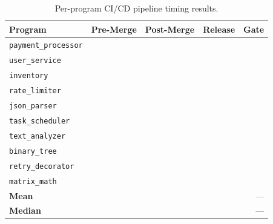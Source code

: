 \documentclass[11pt]{article}
\begin{document}
\begin{table}[t]
\centering
\caption{Per-program CI/CD pipeline timing results.}
\label{tab:per-program-pipeline}
\begin{tabular}{lrrrr}
\toprule
\textbf{Program} & \textbf{Pre-Merge} & \textbf{Post-Merge} &
  \textbf{Release} & \textbf{Gate} \\
\midrule
\texttt{payment\_processor} & \ppLXVcipaymentprocessorPre{} &
  \ppLXVcipaymentprocessorPost{} & \ppLXVcipaymentprocessorRelease{} &
  \ppLXVcipaymentprocessorGate{} \\
\texttt{user\_service} & \ppLXVciuserservicePre{} &
  \ppLXVciuserservicePost{} & \ppLXVciuserserviceRelease{} &
  \ppLXVciuserserviceGate{} \\
\texttt{inventory} & \ppLXVciinventoryPre{} &
  \ppLXVciinventoryPost{} & \ppLXVciinventoryRelease{} &
  \ppLXVciinventoryGate{} \\
\texttt{rate\_limiter} & \ppLXVciratelimiterPre{} &
  \ppLXVciratelimiterPost{} & \ppLXVciratelimiterRelease{} &
  \ppLXVciratelimiterGate{} \\
\texttt{json\_parser} & \ppLXVcijsonparserPre{} &
  \ppLXVcijsonparserPost{} & \ppLXVcijsonparserRelease{} &
  \ppLXVcijsonparserGate{} \\
\texttt{task\_scheduler} & \ppLXVcitaskschedulerPre{} &
  \ppLXVcitaskschedulerPost{} & \ppLXVcitaskschedulerRelease{} &
  \ppLXVcitaskschedulerGate{} \\
\texttt{text\_analyzer} & \ppLXVcitextanalyzerPre{} &
  \ppLXVcitextanalyzerPost{} & \ppLXVcitextanalyzerRelease{} &
  \ppLXVcitextanalyzerGate{} \\
\texttt{binary\_tree} & \ppLXVcibinarytreePre{} &
  \ppLXVcibinarytreePost{} & \ppLXVcibinarytreeRelease{} &
  \ppLXVcibinarytreeGate{} \\
\texttt{retry\_decorator} & \ppLXVciretrydecoratorPre{} &
  \ppLXVciretrydecoratorPost{} & \ppLXVciretrydecoratorRelease{} &
  \ppLXVciretrydecoratorGate{} \\
\texttt{matrix\_math} & \ppLXVcimatrixmathPre{} &
  \ppLXVcimatrixmathPost{} & \ppLXVcimatrixmathRelease{} &
  \ppLXVcimatrixmathGate{} \\
\midrule
\textbf{Mean} & \ppLXVpreMean{} & \ppLXVpostMean{} &
  \ppLXVreleaseMean{} & --- \\
\textbf{Median} & \ppLXVpreMedian{} & \ppLXVpostMedian{} &
  \ppLXVreleaseMedian{} & --- \\
\bottomrule
\end{tabular}
\end{table}
\end{document}
